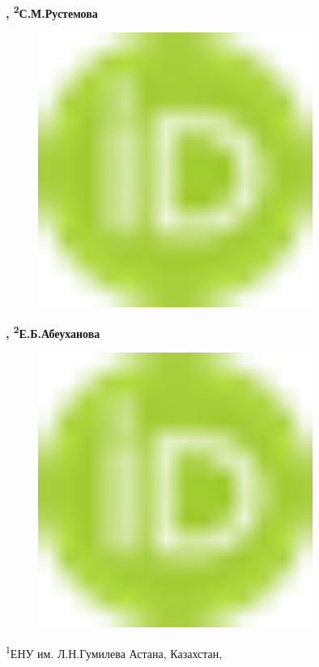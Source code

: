 {\bfseries ,
\textsuperscript{2}С.М.Рустемова}
\begin{figure}[H]
	\centering
	\includegraphics[width=0.8\textwidth]{media/ekon2/image1}
	\caption*{}
\end{figure}
{\bfseries ,
\textsuperscript{2}Е.Б.Абеуханова}
\begin{figure}[H]
	\centering
	\includegraphics[width=0.8\textwidth]{media/ekon2/image1}
	\caption*{}
\end{figure}


\textsuperscript{1}ЕНУ им. Л.Н.Гумилева Астана, Казахстан,

